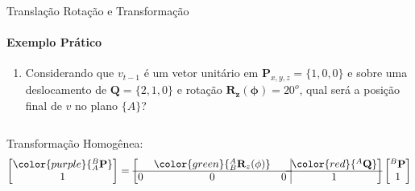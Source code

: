 \documentclass{beamer}
\begin{document}
\begin{frame}{Translação Rotação e Transformação}
    \framesubtitle{Exemplo Prático}
    \begin{enumerate}
        \item Considerando que $v_{t-1}$ é um vetor unitário em $\mathbf{P}_{x,y,z}=\{1,0,0\}$ e sobre uma deslocamento de $\mathbf{Q}=\{2,1,0\}$ e rotação $\mathbf{R_z(\phi)}=20^o$, qual será a posição final de $v$ no plano $\{A\}$?
    \end{enumerate}
    \begin{columns}
        \begin{column}[c]{0.5\textwidth}
            
        \end{column}
        \begin{column}[c]{0.5\textwidth}
            
        \end{column}
    \end{columns}
    Transformação Homogênea:
    \begin{equation*}
        \begin{bmatrix}
        \color{purple}{{}^B_A\mathbf{P}}\\ 1
        \end{bmatrix}
        =
        \left[
        \begin{matrix}
        & \color{green}{{}_B^A\mathbf{R}_z(\phi)}& \\ \hline
        0 & 0 & 0\\
        \end{matrix} \right.
        \left.
        \vline
        \begin{matrix}
        \color{red}{{}^A\mathbf{Q}}\\ \hline
        1
        \end{matrix} \right]
        \begin{bmatrix}
        {}^B\mathbf{P}\\
        1
        \end{bmatrix}
    \end{equation*}
\end{frame}
\end{document}
